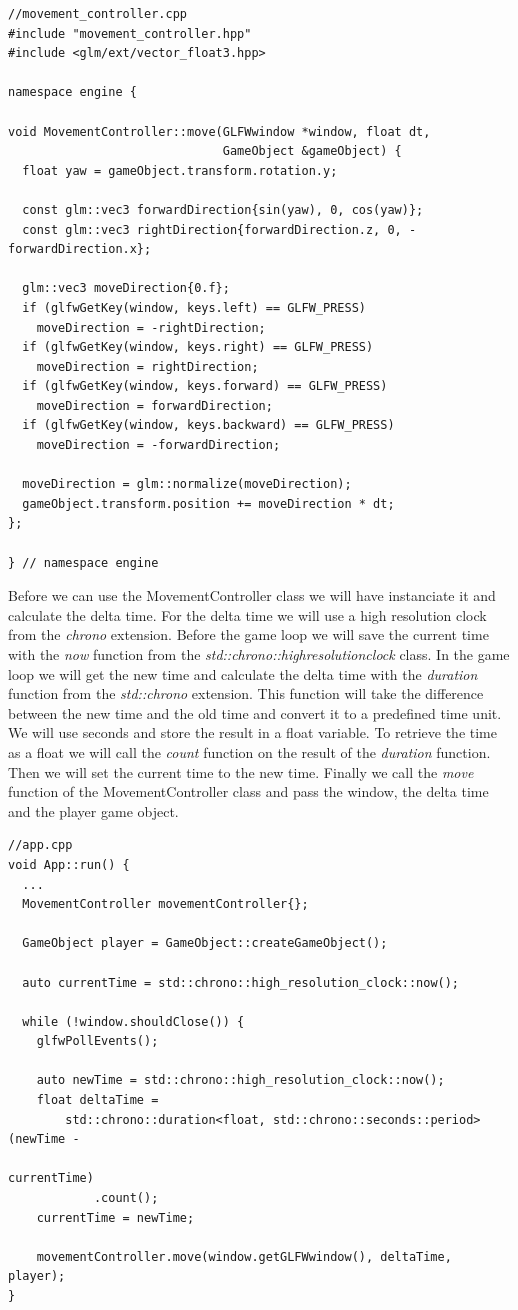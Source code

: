 \documentclass[12pt]{report} \usepackage{preamble}
\begin{document}
\begin{lstlisting}[Language=C++]
//movement_controller.cpp
#include "movement_controller.hpp"
#include <glm/ext/vector_float3.hpp>

namespace engine {

void MovementController::move(GLFWwindow *window, float dt,
                              GameObject &gameObject) {
  float yaw = gameObject.transform.rotation.y;

  const glm::vec3 forwardDirection{sin(yaw), 0, cos(yaw)};
  const glm::vec3 rightDirection{forwardDirection.z, 0, -forwardDirection.x};

  glm::vec3 moveDirection{0.f};
  if (glfwGetKey(window, keys.left) == GLFW_PRESS)
    moveDirection = -rightDirection;
  if (glfwGetKey(window, keys.right) == GLFW_PRESS)
    moveDirection = rightDirection;
  if (glfwGetKey(window, keys.forward) == GLFW_PRESS)
    moveDirection = forwardDirection;
  if (glfwGetKey(window, keys.backward) == GLFW_PRESS)
    moveDirection = -forwardDirection;

  moveDirection = glm::normalize(moveDirection);
  gameObject.transform.position += moveDirection * dt;
};

} // namespace engine
\end{lstlisting}

Before we can use the MovementController class we will have instanciate it and calculate the delta time.
For the delta time we will use a high resolution clock from the \textit{chrono} extension.
Before the game loop we will save the current time with the \textit{now} function from the \textit{std::chrono::high\textunderscore resolution\textunderscore clock} class.
In the game loop we will get the new time and calculate the delta time with the \textit{duration} function from the \textit{std::chrono} extension.
This function will take the difference between the new time and the old time and convert it to a predefined time unit. We will use seconds and store the result in a float variable.
To retrieve the time as a float we will call the \textit{count} function on the result of the \textit{duration} function.
Then we will set the current time to the new time.
Finally we call the \textit{move} function of the MovementController class and pass the window, the delta time and the player game object.

\begin{lstlisting}[Language=C++]
//app.cpp
void App::run() {
  ...
  MovementController movementController{};

  GameObject player = GameObject::createGameObject();

  auto currentTime = std::chrono::high_resolution_clock::now();

  while (!window.shouldClose()) {
    glfwPollEvents();

    auto newTime = std::chrono::high_resolution_clock::now();
    float deltaTime =
        std::chrono::duration<float, std::chrono::seconds::period>(newTime -
                                                                   currentTime)
            .count();
    currentTime = newTime;

    movementController.move(window.getGLFWwindow(), deltaTime, player);
}
\end{lstlisting}
\end{document}
